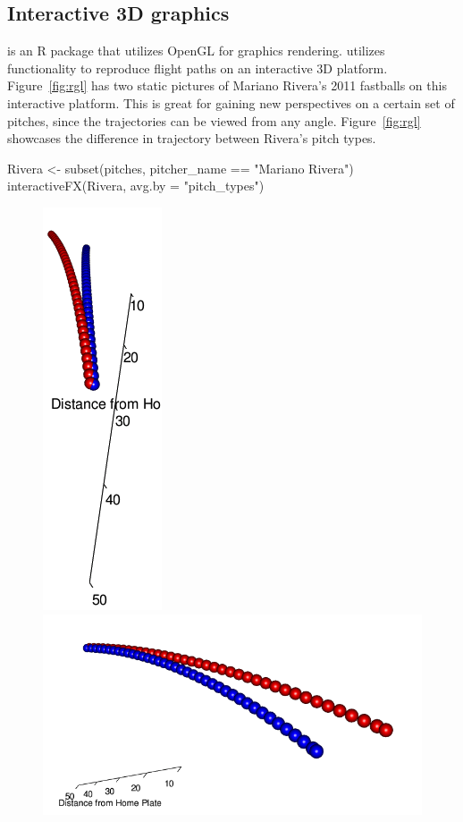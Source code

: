\begin{article}
\subsection{Interactive 3D graphics}

 is an R package that utilizes OpenGL for graphics rendering.
 utilizes  functionality to reproduce
flight paths on an interactive 3D platform. Figure~\ref{fig:rgl}
has two static pictures of Mariano Rivera's 2011 fastballs on this
interactive platform. This is great for gaining new perspectives on
a certain set of pitches, since the trajectories can be viewed from
any angle. Figure~\ref{fig:rgl} showcases the difference in trajectory
between Rivera's pitch types.
%
\begin{Schunk}
\begin{Sinput}
Rivera <- subset(pitches, pitcher_name == "Mariano Rivera")
interactiveFX(Rivera, avg.by = "pitch_types")
\end{Sinput}
\end{Schunk}
%
\begin{figure}[h]
\begin{minipage}[t]{0.45\textwidth}%
\centerline{\includegraphics[scale = .45]{rgl_b.png}}%
\end{minipage}\hspace*{\fill}%
\begin{minipage}[t]{0.45\textwidth}%
\centerline{\includegraphics[scale = .4]{rgl_a.png}}%

\end{minipage}
\end{figure}
\end{article}
